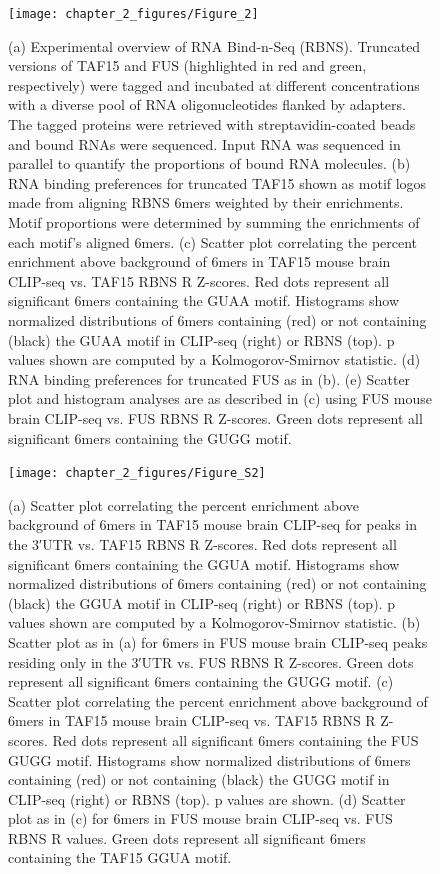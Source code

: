 \begin{figure}[ht]
  \centering
  \texttt{[image: chapter\_2\_figures/Figure\_2]}
  \caption[Figure 2. RNA Bind-n-Seq confirms enrichment for GGUA motifs in RNAs that bind TAF15 in vitro]{(a) Experimental overview of RNA Bind-n-Seq (RBNS). Truncated versions of TAF15 and FUS (highlighted in red and green, respectively) were tagged and incubated at different concentrations with a diverse pool of RNA oligonucleotides flanked by adapters. The tagged proteins were retrieved with streptavidin-coated beads and bound RNAs were sequenced. Input RNA was sequenced in parallel to quantify the proportions of bound RNA molecules. (b) RNA binding preferences for truncated TAF15 shown as motif logos made from aligning RBNS 6mers weighted by their enrichments. Motif proportions were determined by summing the enrichments of each motif’s aligned 6mers. (c) Scatter plot correlating the percent enrichment above background of 6mers in TAF15 mouse brain CLIP-seq vs. TAF15 RBNS R Z-scores. Red dots represent all significant 6mers containing the GUAA motif. Histograms show normalized distributions of 6mers containing (red) or not containing (black) the GUAA motif in CLIP-seq (right) or RBNS (top). p values shown are computed by a Kolmogorov-Smirnov statistic. (d) RNA binding preferences for truncated FUS as in (b). (e) Scatter plot and histogram analyses are as described in (c) using FUS mouse brain CLIP-seq vs. FUS RBNS R Z-scores. Green dots represent all significant 6mers containing the GUGG motif.}
  \label{fig:Figure_2}
\end{figure}

\begin{figure}[ht]
  \centering
  \texttt{[image: chapter\_2\_figures/Figure\_S2]}
  \caption[Supplementary Figure 2. RNA Bind-n-Seq confirms enrichment for GGUA motifs in RNAs that bind TAF15 in vitro]{(a) Scatter plot correlating the percent enrichment above background of 6mers in TAF15 mouse brain CLIP-seq for peaks in the 3′UTR vs. TAF15 RBNS R Z-scores. Red dots represent all significant 6mers containing the GGUA motif. Histograms show normalized distributions of 6mers containing (red) or not containing (black) the GGUA motif in CLIP-seq (right) or RBNS (top). p values shown are computed by a Kolmogorov-Smirnov statistic. (b) Scatter plot as in (a) for 6mers in FUS mouse brain CLIP-seq peaks residing only in the 3′UTR vs. FUS RBNS R Z-scores. Green dots represent all significant 6mers containing the GUGG motif. (c) Scatter plot correlating the percent enrichment above background of 6mers in TAF15 mouse brain CLIP-seq vs. TAF15 RBNS R Z-scores. Red dots represent all significant 6mers containing the FUS GUGG motif. Histograms show normalized distributions of 6mers containing (red) or not containing (black) the GUGG motif in CLIP-seq (right) or RBNS (top). p values are shown. (d) Scatter plot as in (c) for 6mers in FUS mouse brain CLIP-seq vs. FUS RBNS R values. Green dots represent all significant 6mers containing the TAF15 GGUA motif.}
  \label{fig:Figure_S2}
\end{figure}


